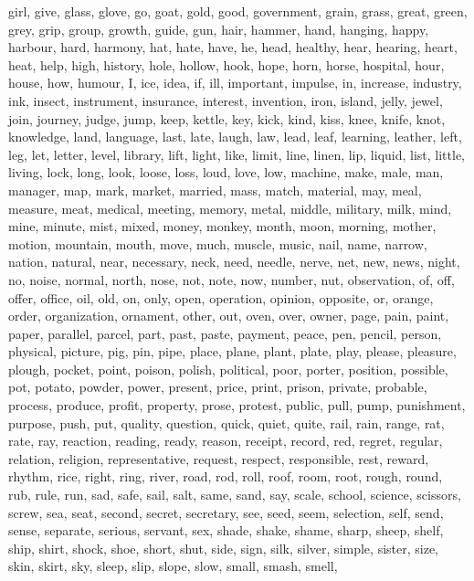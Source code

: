 \begin{multicols}{2}
girl, give, glass, glove, go, goat, gold, good, government, grain, grass,
great, green, grey, grip, group, growth, guide, gun, hair, hammer, hand,
hanging, happy, harbour, hard, harmony, hat, hate, have, he, head, healthy,
hear, hearing, heart, heat, help, high, history, hole, hollow, hook, hope,
horn, horse, hospital, hour, house, how, humour, I, ice, idea, if, ill,
important, impulse, in, increase, industry, ink, insect, instrument,
insurance, interest, invention, iron, island, jelly, jewel, join, journey,
judge, jump, keep, kettle, key, kick, kind, kiss, knee, knife, knot,
knowledge, land, language, last, late, laugh, law, lead, leaf, learning,
leather, left, leg, let, letter, level, library, lift, light, like, limit,
line, linen, lip, liquid, list, little, living, lock, long, look, loose, loss,
loud, love, low, machine, make, male, man, manager, map, mark, market,
married, mass, match, material, may, meal, measure, meat, medical, meeting,
memory, metal, middle, military, milk, mind, mine, minute, mist, mixed, money,
monkey, month, moon, morning, mother, motion, mountain, mouth, move, much,
muscle, music, nail, name, narrow, nation, natural, near, necessary, neck,
need, needle, nerve, net, new, news, night, no, noise, normal, north, nose,
not, note, now, number, nut, observation, of, off, offer, office, oil, old,
on, only, open, operation, opinion, opposite, or, orange, order, organization,
ornament, other, out, oven, over, owner, page, pain, paint, paper, parallel,
parcel, part, past, paste, payment, peace, pen, pencil, person, physical,
picture, pig, pin, pipe, place, plane, plant, plate, play, please, pleasure,
plough, pocket, point, poison, polish, political, poor, porter, position,
possible, pot, potato, powder, power, present, price, print, prison, private,
probable, process, produce, profit, property, prose, protest, public, pull,
pump, punishment, purpose, push, put, quality, question, quick, quiet, quite,
rail, rain, range, rat, rate, ray, reaction, reading, ready, reason, receipt,
record, red, regret, regular, relation, religion, representative, request,
respect, responsible, rest, reward, rhythm, rice, right, ring, river, road,
rod, roll, roof, room, root, rough, round, rub, rule, run, sad, safe, sail,
salt, same, sand, say, scale, school, science, scissors, screw, sea, seat,
second, secret, secretary, see, seed, seem, selection, self, send, sense,
separate, serious, servant, sex, shade, shake, shame, sharp, sheep, shelf,
ship, shirt, shock, shoe, short, shut, side, sign, silk, silver, simple,
sister, size, skin, skirt, sky, sleep, slip, slope, slow, small, smash, smell,

\end{multicols}
